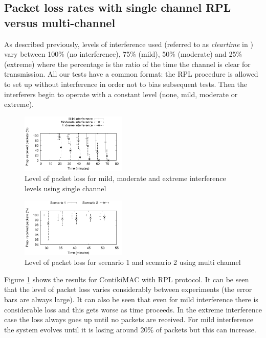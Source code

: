 \subsection{Packet loss rates with single channel RPL versus multi-channel}
As described previously, levels of interference used (referred to as \emph{clear\textunderscore time} in \cite{Boano:2010:MSM:2127940.2127963})
vary between 100\% (no interference), 75\% (mild), 50\% (moderate) and 25\% (extreme) where the percentage is the ratio of the time the channel is clear for transmission.  All our tests have a common format: the RPL procedure is allowed to set up without interference in order not to bias subsequent tests.
Then the interferers begin to operate with a constant level (none, mild, moderate or extreme).

\begin{figure}
\centering
\includegraphics[width=0.45\textwidth]{experiments/single_channel.pdf}
\caption{Level of packet loss for mild, moderate and extreme interference levels using single channel}
\label{fig:interference}
\end{figure}

\begin{figure}
\centering
\includegraphics[width=0.45\textwidth]{experiments/multi_channel.pdf}
\caption{Level of packet loss for scenario 1 and scenario 2 using multi channel}
\label{fig:multi_interference}
\end{figure}

Figure \ref{fig:interference} shows the results for ContikiMAC with RPL protocol. It can be seen that the level of packet loss varies considerably between experiments (the error bars are always large). It can also be seen that even for mild interference there is considerable loss and this gets worse as time proceeds. In the extreme interference case the loss always goes up until no packets are received. For mild interference the system evolves until it is losing around 20\% of packets but this can increase.

